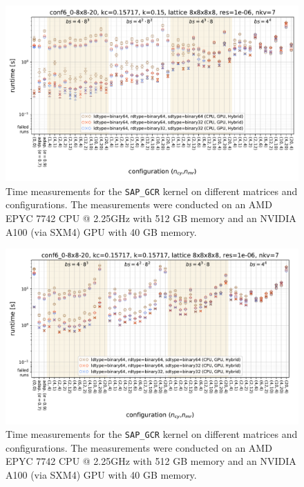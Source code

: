 \documentclass{article}
\theoremstyle{plain} %
\theoremstyle{convention} %
\theoremstyle{remark} %
\def\code#1{\texttt{#1}}
\numberwithin{equation}{section}
\begin{document}
\begin{figure}[h]
    \centering
    \includegraphics[width=1.0\textwidth]{plots/sap_gcr_conf6_0-8x8-20_kc=0.15717_k=0.15_lattice_8x8x8x8_res=1e-06_nkv=7}
    \caption{Time measurements for the \code{SAP\_GCR} kernel on different matrices and configurations. The measurements were conducted on an AMD EPYC 7742 CPU @ 2.25GHz with 512 GB memory and an NVIDIA A100 (via SXM4) GPU with 40 GB memory.}
    \label{fig:sap_gcr2}
    \label{fig:sap_gcr_conf6_0-8x8-20_0.15}
\end{figure}

\begin{figure}[h]
    \centering
    \includegraphics[width=1.0\textwidth]{plots/sap_gcr_conf6_0-8x8-20_kc=0.15717_k=0.15717_lattice_8x8x8x8_res=1e-06_nkv=7}
    \caption{Time measurements for the \code{SAP\_GCR} kernel on different matrices and configurations. The measurements were conducted on an AMD EPYC 7742 CPU @ 2.25GHz with 512 GB memory and an NVIDIA A100 (via SXM4) GPU with 40 GB memory.}
    \label{fig:sap_gcr1}
    \label{fig:sap_gcr_conf6_0-8x8-20_0.15717}
\end{figure}
\end{document}
